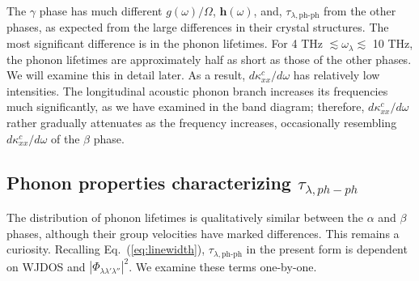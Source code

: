 \documentclass[twocolumn,amsmath,amssymb,a4paper,prb,superscriptaddress,floatfix]{revtex4-1}
\begin{document}
The $\gamma$ phase has much different $g(\omega)/\Omega$, $\boldsymbol{h}(\omega)$,
and, $\tau_{\lambda,\text{ph-ph}}$ from the other phases, as expected from the
large differences in their crystal structures. The most significant difference
is in the phonon lifetimes. For 4 THz $\lesssim\omega_\lambda\lesssim$ 10 THz,
the phonon lifetimes are approximately half as short as those of the other
phases. We will examine this in detail later. As a result,
$d\kappa_{xx}^c/d\omega$ has relatively low intensities. The longitudinal
acoustic phonon branch increases its frequencies much significantly, as we have
examined in the band diagram; therefore, $d\kappa_{xx}^c/d\omega$ rather
gradually attenuates as the frequency increases, occasionally resembling
$d\kappa_{xx}^c/d\omega$ of the $\beta$ phase.

\subsection{Phonon properties characterizing $\tau_{\lambda,ph-ph}$}

The distribution of phonon lifetimes is qualitatively similar between the $\alpha$ and
$\beta$ phases, although their group velocities have marked differences. This
remains a curiosity.
Recalling Eq.~(\ref{eq:linewidth}), $\tau_{\lambda,\text{ph-ph}}$ in the
present form is dependent on WJDOS
and $|\Phi_{\lambda\lambda'\lambda''}|^2$. We examine these terms one-by-one.
\end{document}
